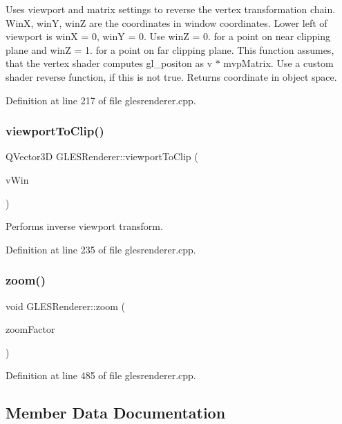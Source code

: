 Uses viewport and matrix settings to reverse the vertex transformation chain. WinX, winY, winZ are the coordinates in window coordinates. Lower left of viewport is winX = 0, winY = 0. Use winZ = 0. for a point on near clipping plane and winZ = 1. for a point on far clipping plane. This function assumes, that the vertex shader computes gl\+\_\+positon as v $\ast$ mvp\+Matrix. Use a custom shader reverse function, if this is not true. Returns coordinate in object space. 

Definition at line 217 of file glesrenderer.\+cpp.

\mbox{\label{class_g_l_e_s_renderer_a36440b34ef23691928cb033a55c9c6f9}} 
\subsubsection{\texorpdfstring{viewportToClip()}{viewportToClip()}}
{\footnotesize\ttfamily Q\+Vector3D G\+L\+E\+S\+Renderer\+::viewport\+To\+Clip (\begin{DoxyParamCaption}\item[{const Q\+Vector3D \&}]{v\+Win }\end{DoxyParamCaption})}

Performs inverse viewport transform. 

Definition at line 235 of file glesrenderer.\+cpp.

\mbox{\label{class_g_l_e_s_renderer_a43e69a0a8c38adf1faae474c33fb7bb8}} 
\subsubsection{\texorpdfstring{zoom()}{zoom()}}
{\footnotesize\ttfamily void G\+L\+E\+S\+Renderer\+::zoom (\begin{DoxyParamCaption}\item[{float}]{zoom\+Factor }\end{DoxyParamCaption})}



Definition at line 485 of file glesrenderer.\+cpp.



\subsection{Member Data Documentation}
\mbox{\label{class_g_l_e_s_renderer_a923229687ee02d0364a7e472fa1ed578}} 
